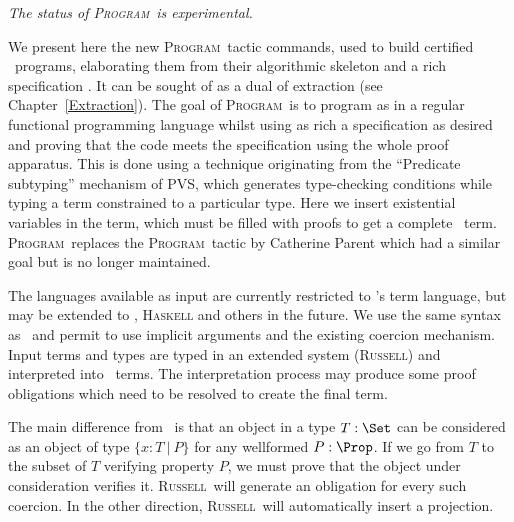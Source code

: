 \def\Program{\textsc{Program}}
\def\Russell{\textsc{Russell}}
\def\PVS{\textsc{PVS}}

\achapter{\Program{}}
\label{Program}

\begin{flushleft}
  \em The status of \Program\ is experimental.
\end{flushleft}

We present here the new \Program\ tactic commands, used to build certified
\Coq\ programs, elaborating them from their algorithmic skeleton and a
rich specification \cite{Sozeau06}. It can be sought of as a dual of extraction
(see Chapter~\ref{Extraction}). The goal of \Program~is to program as in a regular
functional programming language whilst using as rich a specification as 
desired and proving that the code meets the specification using the whole \Coq{} proof
apparatus. This is done using a technique originating from the
``Predicate subtyping'' mechanism of \PVS \cite{Rushby98}, which generates type-checking
conditions while typing a term constrained to a particular type. 
Here we insert existential variables in the term, which must be filled
with proofs to get a complete \Coq\ term. \Program\ replaces the
\Program\ tactic by Catherine Parent \cite{Parent95b} which had a similar goal but is no longer
maintained.

The languages available as input are currently restricted to \Coq's term
language, but may be extended to \ocaml{}, \textsc{Haskell} and others
in the future. We use the same syntax as \Coq\ and permit to use implicit
arguments and the existing coercion mechanism.
Input terms and types are typed in an extended system (\Russell) and
interpreted into \Coq\ terms. The interpretation process may produce
some proof obligations which need to be resolved to create the final term.

The main difference from \Coq\ is that an object in a type $T : \Set$
can be considered as an object of type $\{ x : T~|~P\}$ for any
wellformed $P : \Prop$. 
If we go from $T$ to the subset of $T$ verifying property $P$, we must
prove that the object under consideration verifies it. \Russell\ will
generate an obligation for every such coercion. In the other direction,
\Russell\ will automatically insert a projection.

